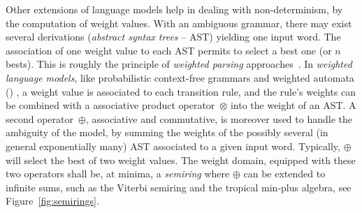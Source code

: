 Other extensions of language models  %
help in dealing with non-determinism, by the computation of weight values. 
With an ambiguous grammar, there may exist several derivations 
(\emph{abstract syntax trees} -- AST) %
yielding one input word. %
The association of one weight value %
to each AST permits to select a best one (or $n$ bests). %
This is roughly the principle of \emph{weighted parsing}
approaches~\cite{Goodman99SemiringParsing,Nederhof03weightedParsing,MorbitzVogler19weighted-parsing}.
In \emph{weighted language models}, 
like \eg probabilistic context-free grammars %
and weighted automata (\WA) \cite{Droste09handbook},
a weight value is associated to each transition rule, %
and the rule's weights can be combined with a associative product operator~$\otimes$ into 
the weight of an AST.
A second operator~$\oplus$, associative and commutative, 
is moreover used to handle the ambiguity of the model, 
by summing the weights of the possibly several (in general exponentially many) AST %
associated to a given input word.
Typically, $\oplus$ will select the best of two weight values.
The weight domain, equipped with these two operators shall be, at minima, 
a \emph{semiring} %
where $\oplus$ can be extended to infinite sums, 
such as the Viterbi semiring and the tropical min-plus algebra, see Figure~\ref{fig:semirings}. 

